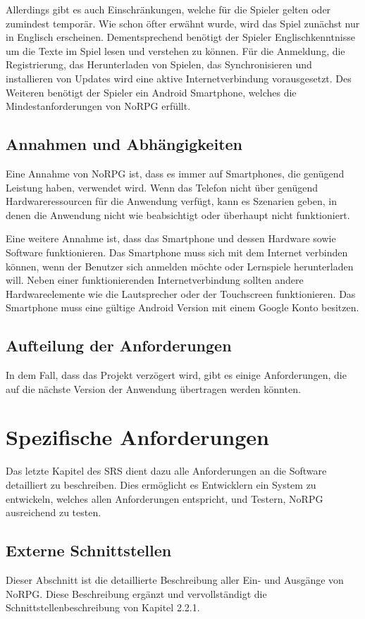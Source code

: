 		Allerdings gibt es auch Einschränkungen, welche für die Spieler gelten oder zumindest temporär. Wie schon öfter erwähnt wurde, wird das Spiel zunächst nur in Englisch erscheinen. Dementsprechend benötigt der Spieler Englischkenntnisse um die Texte im Spiel lesen und verstehen zu können. Für die Anmeldung, die Registrierung, das Herunterladen von Spielen, das Synchronisieren und installieren von Updates wird eine aktive Internetverbindung vorausgesetzt. Des Weiteren benötigt der Spieler ein Android Smartphone, welches die Mindestanforderungen von NoRPG erfüllt.
				
	\subsection{Annahmen und Abhängigkeiten}
		Eine Annahme von NoRPG ist, dass es immer auf Smartphones, die genügend Leistung haben, verwendet wird. Wenn das Telefon nicht über genügend Hardwareressourcen für die Anwendung verfügt, kann es Szenarien geben, in denen die Anwendung nicht wie beabsichtigt oder überhaupt nicht funktioniert.
		
		Eine weitere Annahme ist, dass das Smartphone und dessen Hardware sowie Software funktionieren. Das Smartphone muss sich mit dem Internet verbinden können, wenn der Benutzer sich anmelden möchte oder Lernspiele herunterladen will. Neben einer funktionierenden Internetverbindung sollten andere Hardwareelemente wie die Lautsprecher oder der Touchscreen funktionieren. Das Smartphone muss eine gültige Android Version mit einem Google Konto besitzen.
		
	\subsection{Aufteilung der Anforderungen}
		In dem Fall, dass das Projekt verzögert wird, gibt es einige Anforderungen, die auf die nächste Version der Anwendung übertragen werden könnten.

\section{Spezifische Anforderungen}
	Das letzte Kapitel des \ac{SRS} dient dazu alle Anforderungen an die Software detailliert zu beschreiben. Dies ermöglicht es Entwicklern ein System zu entwickeln, welches allen Anforderungen entspricht, und Testern, NoRPG ausreichend zu testen.
	
	\subsection{Externe Schnittstellen}
		Dieser Abschnitt ist die detaillierte Beschreibung aller Ein- und Ausgänge von NoRPG. Diese Beschreibung ergänzt und vervollständigt die Schnittstellenbeschreibung von Kapitel 2.2.1. 
	

